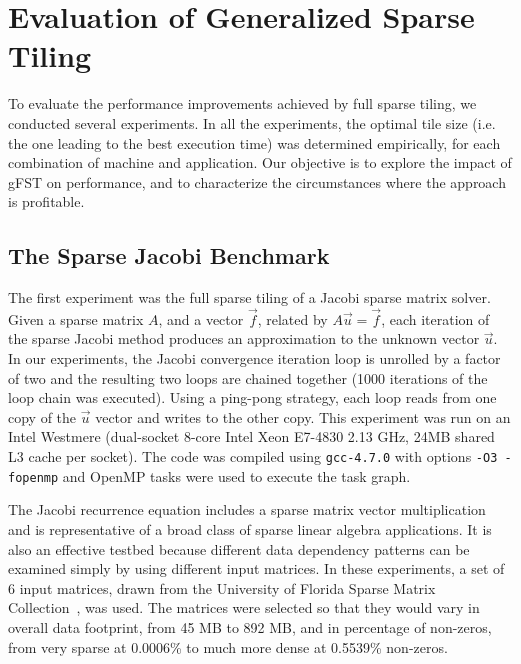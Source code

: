 \section{Evaluation of Generalized Sparse Tiling}
\label{sec:evaluation}
To evaluate the performance improvements achieved by full sparse tiling, we conducted several experiments. 
In all the experiments, the optimal tile size (i.e. the one leading to the best execution time) was determined empirically, for each combination of machine and application. Our objective is to explore 
the impact of gFST on %
performance, and to characterize the circumstances where the approach is profitable.


\subsection{The Sparse Jacobi Benchmark}
\label{sec:gfst-evaluation}


The first experiment was the full sparse tiling of a Jacobi sparse matrix solver. Given a sparse matrix $A$,
and a vector $\vec{f}$, related by $A\vec{u}=\vec{f}$, each iteration of the sparse Jacobi method produces
an approximation to the unknown vector $\vec{u}$. In our experiments, the Jacobi convergence 
iteration loop is unrolled by a factor of two and the resulting two loops are chained together 
(1000 iterations of the loop chain
was executed).
Using a ping-pong strategy, each loop reads from one copy of the $\vec{u}$ vector 
and writes to the other copy. This experiment was run on an Intel Westmere 
(dual-socket 8-core Intel Xeon E7-4830 2.13 GHz, 24MB shared L3 cache per socket).
The code was compiled using {\tt gcc-4.7.0} with options {\tt -O3 -fopenmp} and OpenMP tasks were used
to execute the task graph. 

The Jacobi recurrence equation includes a sparse matrix vector multiplication and is representative of a broad class of sparse linear algebra applications. It is also an effective testbed because different data dependency patterns can be examined simply by using different input matrices. In these experiments, a set of 6 input matrices, drawn from the University of Florida Sparse Matrix Collection~\citep{MatrixMarket}, was used. The matrices were selected so that they would vary in overall data footprint, from 45 MB to 892 MB, and in percentage of non-zeros, from very sparse at 0.0006\% to 
much more dense at 0.5539\% non-zeros. %

